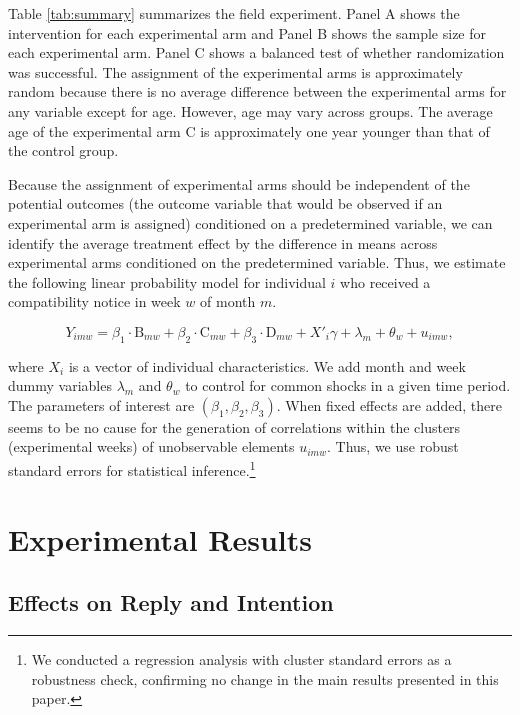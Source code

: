 \documentclass[
  11pt,
  a4paper
]{article}
\begin{document}
Table \ref{tab:summary} summarizes the field experiment. Panel A shows the intervention for each experimental arm and Panel B shows the sample size for each experimental arm. Panel C shows a balanced test of whether randomization was successful. The assignment of the experimental arms is approximately random because there is no average difference between the experimental arms for any variable except for age. However, age may vary across groups. The average age of the experimental arm C is approximately one year younger than that of the control group.

Because the assignment of experimental arms should be independent of the potential outcomes (the outcome variable that would be observed if an experimental arm is assigned) conditioned on a predetermined variable, we can identify the average treatment effect by the difference in means across experimental arms conditioned on the predetermined variable. Thus, we estimate the following linear probability model for individual \(i\) who received a compatibility notice in week \(w\) of month \(m\).

\begin{equation}
  Y_{imw} =
  \beta_1 \cdot \text{B}_{mw} + \beta_2 \cdot \text{C}_{mw} + \beta_3 \cdot \text{D}_{mw}
  + X'_i \gamma + \lambda_m + \theta_w + u_{imw}, \label{eq:reg}
\end{equation}

where \(X_i\) is a vector of individual characteristics. We add month and week dummy variables \(\lambda_m\) and \(\theta_w\) to control for common shocks in a given time period. The parameters of interest are \((\beta_1, \beta_2, \beta_3)\). When fixed effects are added, there seems to be no cause for the generation of correlations within the clusters (experimental weeks) of unobservable elements \(u_{imw}\). Thus, we use robust standard errors for statistical inference.\footnote{We conducted a regression analysis with cluster standard errors as a robustness check, confirming no change in the main results presented in this paper.}

\hypertarget{result}{%
\section{Experimental Results}\label{result}}

\hypertarget{intention}{%
\subsection{Effects on Reply and Intention}\label{intention}}
\end{document}
